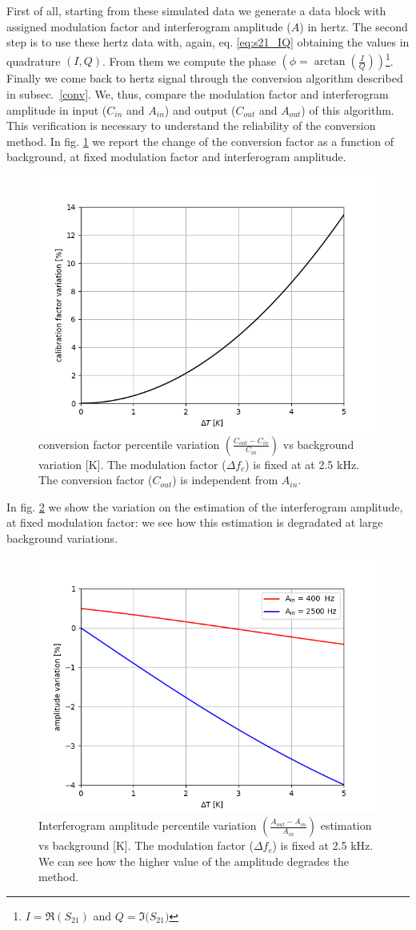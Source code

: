 \documentclass[twocolumn,traditabstract]{aa}\\
\begin{document}
First of all, starting from these simulated data we generate a data block with assigned modulation factor and interferogram amplitude ($A$) in hertz. The second step is to use these hertz data with, again, eq. \ref{eq:s21_IQ} obtaining the values in quadrature $(I,Q)$. From them we compute the phase $\left( \phi=\arctan\left(\frac{I}{Q}\right) \right)$\footnote{ $I = \Re(S_{21})$ and $Q = \Im({S_{21})}$ }. Finally we come back to hertz signal through the conversion algorithm described in subsec.~\ref{conv}. We, thus, compare the modulation factor and interferogram amplitude in input ($C_{in}$ and $A_{in}$) and output ($C_{out}$ and $A_{out}$) of this algorithm. This verification is necessary to understand the reliability of the conversion method. In fig. \ref{fig:cal_bck} we report the change of the conversion factor as a function of background, at fixed modulation factor and interferogram amplitude.

\begin{figure}[htf]
	\centering
	\includegraphics[width=.5\textwidth]{3.acqui/calibration_factor_variation.png}
	\caption{conversion factor percentile variation $\left( \frac{C_{out}-C_{in}}{C_{in}} \right)$ vs background variation [K]. The modulation factor ($\Delta f_c$) is fixed at at 2.5 kHz. The conversion factor ($C_{out}$) is independent from $A_{in}$.}
	\label{fig:cal_bck}
\end{figure}

\noindent In fig. \ref{fig:amp_bck} we show the variation on the estimation of the interferogram amplitude, at fixed modulation factor: we see how this estimation is degradated at large background variations.

\begin{figure}[htf]
	\centering
	\includegraphics[width=.5\textwidth]{3.acqui/amplitude_variation.png}
	\caption{Interferogram amplitude percentile variation $\left( \frac{A_{out}-A_{in}}{A_{in}} \right)$ estimation vs background [K]. The modulation factor ($\Delta f_c$) is fixed at 2.5 kHz. We can see how the higher value of the amplitude degrades the method.}
	\label{fig:amp_bck}
\end{figure}
\end{document}
